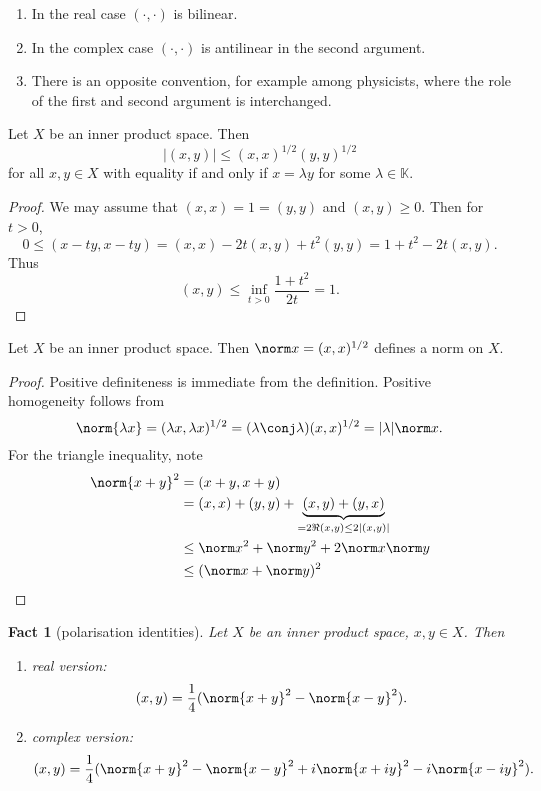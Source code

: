\documentclass[a4paper]{article}
\newtheorem*{fact}{Fact}
\newcommand{\K}{{\mathbb{K}}} %
\begin{document}
\begin{remark}\leavevmode
  \begin{enumerate}
  \item In the real case \((\cdot, \cdot)\) is bilinear.
  \item In the complex case \((\cdot, \cdot)\) is antilinear in the second argument.
  \item There is an opposite convention, for example among physicists, where the role of the first and second argument is interchanged.
  \end{enumerate}
\end{remark}

\begin{proposition}
  Let \(X\) be an inner product space. Then
  \[
    |(x, y)| \leq (x, x)^{1/2} (y, y)^{1/2}
  \]
  for all \(x, y \in X\) with equality if and only if \(x = \lambda y\) for some \(\lambda \in \K\).
\end{proposition}

\begin{proof}
  We may assume that \((x, x) = 1 = (y, y)\) and \((x, y) \geq 0\). Then for \(t > 0\),
  \[
    0 \leq (x - ty, x- ty) = (x, x) - 2t(x, y) + t^2(y, y) = 1 + t^2 - 2t(x, y).
  \]
  Thus
  \[
    (x, y) \leq \inf_{t > 0} \frac{1 + t^2}{2t} = 1.
  \]
\end{proof}

\begin{corollary}
  Let \(X\) be an inner product space. Then \(\norm x = (x, x)^{1/2}\) defines a norm on \(X\).
\end{corollary}

\begin{proof}
  Positive definiteness is immediate from the definition. Positive homogeneity follows from
  \[
    \norm{\lambda x} = (\lambda x, \lambda x)^{1/2} = (\lambda \conj \lambda) (x, x)^{1/2} = |\lambda| \norm x.
  \]
  For the triangle inequality, note
  \begin{align*}
    \norm{x + y}^2
    &= (x + y, x + y) \\
    &= (x, x) + (y, y) + \underbrace{(x, y) + (y, x)}_{= 2 \Re(x, y) \leq 2|(x, y)|} \\
    &\leq \norm x^2 + \norm y^2 + 2 \norm x \norm y \\
    &\leq (\norm x + \norm y)^2
  \end{align*}
\end{proof}

\begin{fact}[polarisation identities]
  Let \(X\) be an inner product space, \(x, y \in X\). Then
  \begin{enumerate}
  \item real version:
    \[
      (x, y) = \frac{1}{4} (\norm{x + y}^2 - \norm{x - y}^2).
    \]
  \item complex version:
    \[
      (x, y) = \frac{1}{4} (\norm{x + y}^2 - \norm{x - y}^2 + i \norm {x + iy}^2 - i \norm{x - iy}^2).
    \]
  \end{enumerate}
\end{fact}
\end{document}
